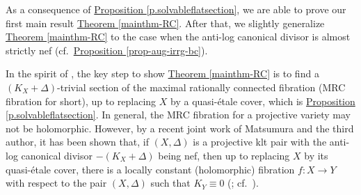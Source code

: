 As a consequence of {\hyperref[p.solvableflatsection]{Proposition  \ref*{p.solvableflatsection}}}, 
we are able to prove our first main result {\hyperref[mainthm-RC]{Theorem \ref*{mainthm-RC}}}. 
After that, we slightly generalize {\hyperref[mainthm-RC]{Theorem \ref*{mainthm-RC}}}  to the case when the anti-log canonical divisor is almost strictly nef (cf.~{\hyperref[prop-aug-irrg-bc]{Proposition \ref*{prop-aug-irrg-bc}}}). 
\begin{rmq}
In the spirit of \cite[Section 4]{LOY19}, the key step to show {\hyperref[mainthm-RC]{Theorem \ref*{mainthm-RC}}} is to find a $(K_X+\Delta)$-trivial section of the  maximal rationally connected fibration (MRC fibration for short), up to replacing $X$ by a quasi-\'etale cover, which is {\hyperref[p.solvableflatsection]{Proposition  \ref*{p.solvableflatsection}}}. 
In general, the MRC fibration for a projective variety may not be holomorphic.
However, by a recent joint work of Matsumura and the third author, it has been shown that, if $(X,\Delta)$ is a projective klt pair with the anti-log canonical divisor $-(K_X+\Delta)$ being nef, then up to replacing $X$ by its quasi-\'etale cover, there is a locally constant (holomorphic) fibration $f:X\to Y$ with respect to the pair $(X,\Delta)$ such that $K_Y\equiv 0$ (\cite[Theorem 1.1]{MW21}; cf.~\cite{Cao19,CH19,CCM19,Wang20}). 
\end{rmq}



